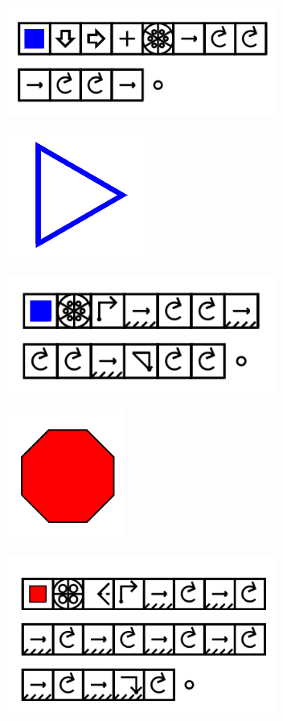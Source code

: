 \documentclass[11pt]{article}
\begin{document}
\includegraphics[width=3.5in]{image30.png}

\includegraphics{image31.png}

\includegraphics[width=3.5in]{image32.png}

\includegraphics{image33.png}

\includegraphics[width=3.5in]{image34.png}
\end{document}
